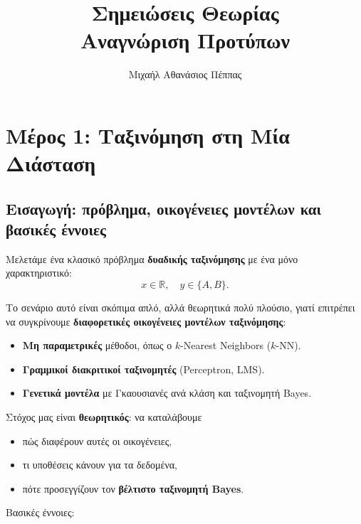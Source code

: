 \documentclass[a4paper,11pt]{article}
\begin{document}
\title{Σημειώσεις Θεωρίας\\[4pt]
       Αναγνώριση Προτύπων}
\author{Μιχαήλ Αθανάσιος Πέππας}
\maketitle

\tableofcontents
\clearpage

\section{Μέρος 1: Ταξινόμηση στη Μία Διάσταση}

\subsection{Εισαγωγή: πρόβλημα, οικογένειες μοντέλων και βασικές έννοιες}

Μελετάμε ένα κλασικό πρόβλημα \textbf{δυαδικής ταξινόμησης} με ένα μόνο χαρακτηριστικό:
\[
x \in \mathbb{R}, \quad y \in \{A,B\}.
\]

Το σενάριο αυτό είναι σκόπιμα απλό, αλλά θεωρητικά πολύ πλούσιο, γιατί επιτρέπει να συγκρίνουμε \textbf{διαφορετικές οικογένειες μοντέλων ταξινόμησης}:

\begin{itemize}
  \item \textbf{Μη παραμετρικές} μέθοδοι, όπως ο $k$-Nearest Neighbors ($k$-NN).
  \item \textbf{Γραμμικοί διακριτικοί ταξινομητές} (Perceptron, LMS).
  \item \textbf{Γενετικά μοντέλα} με Γκαουσιανές ανά κλάση και ταξινομητή Bayes.
\end{itemize}

Στόχος μας είναι \textbf{θεωρητικός}: να καταλάβουμε
\begin{itemize}
  \item πώς διαφέρουν αυτές οι οικογένειες,
  \item τι υποθέσεις κάνουν για τα δεδομένα,
  \item πότε προσεγγίζουν τον \textbf{βέλτιστο ταξινομητή Bayes}.
\end{itemize}

Βασικές έννοιες:
\end{document}
